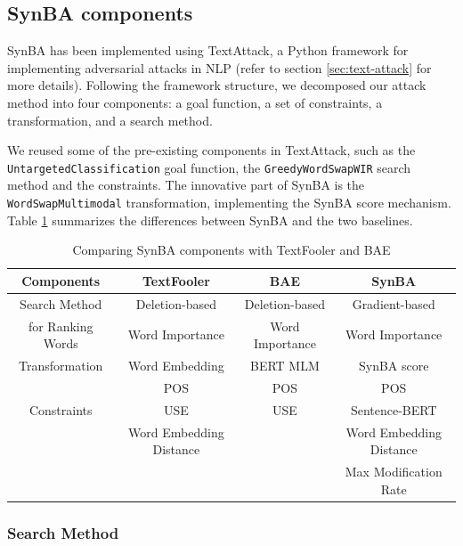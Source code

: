 \subsection{SynBA components}\label{subsec:synba-components}
SynBA has been implemented using TextAttack, a Python framework for implementing adversarial attacks in NLP (refer to section \ref{sec:text-attack} for more details).
Following the framework structure, we decomposed our attack method into four components: a goal function, a set of constraints, a transformation, and a search method.

We reused some of the pre-existing components in TextAttack, such as the \texttt{UntargetedClassification} goal function, the \texttt{GreedyWordSwapWIR} search method and the constraints. 
The innovative part of SynBA is the \texttt{WordSwapMultimodal} transformation, implementing the SynBA score mechanism.
Table \ref{tab:3_3_comparing_components} summarizes the differences between SynBA and the two baselines.

\begin{table}[h]
    \footnotesize
\centering
\begin{tabular}{|c|c|c|c|}
\hline
\textbf{Components} & \textbf{TextFooler} & \textbf{BAE}  & \textbf{SynBA}\\ \hline
Search Method &  Deletion-based &   Deletion-based & Gradient-based\\ 
for Ranking Words & Word Importance & Word Importance & Word Importance \\ \hline
Transformation & Word Embedding & BERT MLM & SynBA score \\ \hline
 & POS  & POS & POS \\ 
 Constraints & USE & USE & Sentence-BERT \\ 
 & Word Embedding Distance &  & Word Embedding Distance \\ 
 &  &  & Max Modification Rate \\ \hline
 
\end{tabular}
\caption{Comparing SynBA components with TextFooler and BAE}
\label{tab:3_3_comparing_components}
\end{table}

\subsubsection{Search Method}\label{subsubsec:search-method}

